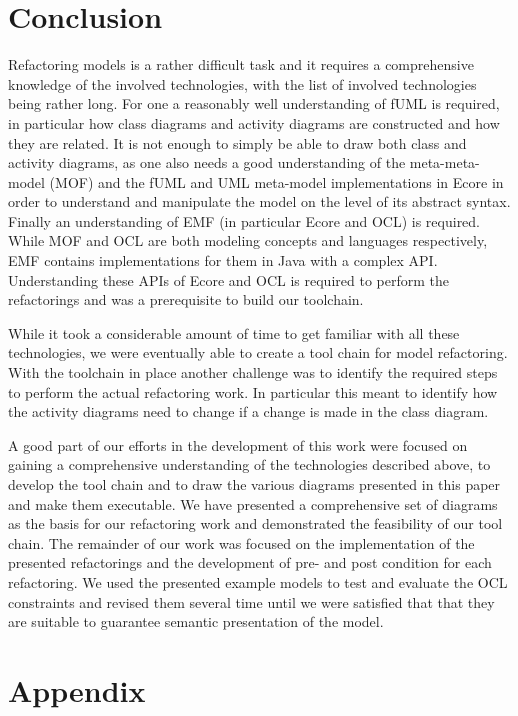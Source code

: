 \documentclass{llncs}
\begin{document}
\section{Conclusion}
\label{sec:conclusion}
Refactoring models is a rather difficult task and it requires a comprehensive knowledge of the involved technologies, with
the list of involved technologies being rather long. For one a reasonably well understanding of fUML is required, in
particular how class diagrams and activity diagrams are constructed and how they are related. It is not enough to simply
be able to draw both class and activity diagrams, as one also needs a good understanding of the meta-meta-model (MOF) and
the fUML and UML meta-model implementations in Ecore in order to understand and manipulate the model on the level of its 
abstract syntax. Finally an understanding of EMF (in particular Ecore and OCL) is required. While MOF and OCL are both 
modeling concepts and languages respectively, EMF contains implementations for them in Java with a complex API. 
Understanding these APIs of Ecore and OCL is required to perform the refactorings and was a prerequisite to build
our toolchain.

While it took a considerable amount of time to get familiar with all these technologies, we were eventually able to
create a tool chain for model refactoring. With the toolchain in place another challenge was to identify the required 
steps to perform the actual refactoring work. In particular this meant to identify how the activity diagrams need to 
change if a change is made in the class diagram.

A good part of our efforts in the development of this work were focused on gaining a comprehensive understanding of the
technologies described above, to develop the tool chain and to draw the various diagrams presented in this paper and make 
them executable. We have presented a comprehensive set of diagrams as the basis for our refactoring work and demonstrated 
the feasibility of our tool chain. The remainder of our work was focused on the implementation of the presented refactorings and
the development of pre- and post condition for each refactoring. We used the presented example models to test and evaluate the
OCL constraints and revised them several time until we were satisfied that that they are suitable to guarantee semantic presentation
of the model.

\newpage



\newpage
\appendix
\section{Appendix}
\label{sec:appendix}
\end{document}
